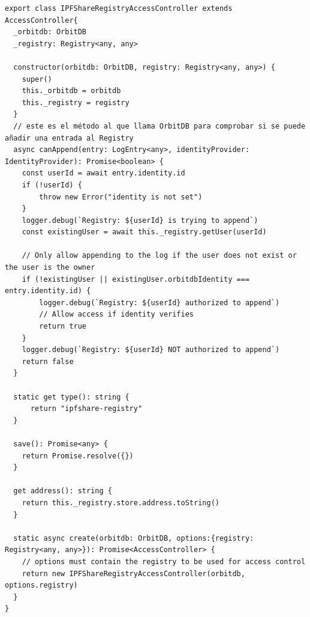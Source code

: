 \begin{verbatim}
export class IPFShareRegistryAccessController extends AccessController{
  _orbitdb: OrbitDB
  _registry: Registry<any, any>

  constructor(orbitdb: OrbitDB, registry: Registry<any, any>) {
    super()
    this._orbitdb = orbitdb
    this._registry = registry
  }
  // este es el método al que llama OrbitDB para comprobar si se puede añadir una entrada al Registry
  async canAppend(entry: LogEntry<any>, identityProvider: IdentityProvider): Promise<boolean> {
    const userId = await entry.identity.id
    if (!userId) {
        throw new Error("identity is not set")
    }
    logger.debug(`Registry: ${userId} is trying to append`)
    const existingUser = await this._registry.getUser(userId)

    // Only allow appending to the log if the user does not exist or the user is the owner
    if (!existingUser || existingUser.orbitdbIdentity === entry.identity.id) {
        logger.debug(`Registry: ${userId} authorized to append`)
        // Allow access if identity verifies
        return true
    }
    logger.debug(`Registry: ${userId} NOT authorized to append`)
    return false
  }

  static get type(): string {
      return "ipfshare-registry"
  }

  save(): Promise<any> {
    return Promise.resolve({})
  }

  get address(): string {
    return this._registry.store.address.toString()
  }

  static async create(orbitdb: OrbitDB, options:{registry: Registry<any, any>}): Promise<AccessController> {
    // options must contain the registry to be used for access control
    return new IPFShareRegistryAccessController(orbitdb, options.registry) 
  }
}
\end{verbatim}

